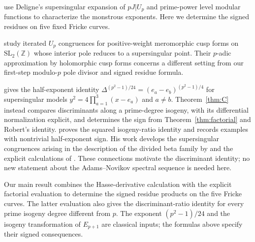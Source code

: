 \documentclass[11pt,a4paper]{article}
\numberwithin{equation}{section}
\theoremstyle{definition}
\theoremstyle{remark}
\newcommand{\Z}{\mathbb Z}
\begin{document}
\citet[Proposition~3.1 and \S4]{DS26} use Deligne's supersingular
expansion of $pJ|U_p$ and prime-power level modular functions to
characterize the monstrous exponents. Here we determine the signed
residues on five fixed Fricke curves.

\citet[Theorem~1.1]{BGKMR26} study iterated $U_p$ congruences for
positive-weight meromorphic cusp forms on $\mathrm{SL}_2(\Z)$ whose
interior pole reduces to a supersingular point. Their $p$-adic
approximation by holomorphic cusp forms concerns a different setting
from our first-step modulo-$p$ pole divisor and signed residue formula.

\citet[Theorem~3, p.~72; \S4]{Landweber88} gives the
half-exponent identity
$\Delta^{(p^2-1)/24}=(e_a-e_b)^{(p^2-1)/4}$ for supersingular
models $y^2=4\prod_{a=1}^3(x-e_a)$ and $a\ne b$.
Theorem~\ref{thm:C} instead compares discriminants along a prime-degree
isogeny, with its differential normalization explicit, and determines
the sign from Theorem~\ref{thm:factorial} and Robert's identity.
\citet[Theorem~1.2 and Remark~4]{Ono25}
proves the squared isogeny-ratio identity and records examples with nontrivial
half-exponent sign. His work develops the supersingular congruences arising in
the description of the divided beta family by \citet[Theorem~1.2]{Behrens09}
and the explicit calculations of \citet[\S5.4, Conjecture~5.17]{Larson20}.
These connections motivate the discriminant identity; no new statement about the
Adams--Novikov spectral sequence is needed here.

Our main result combines the Hasse-derivative calculation with the explicit
factorial evaluation to determine the signed residue products on the five
Fricke curves. The latter evaluation also gives the discriminant-ratio
identity for every prime isogeny degree different from $p$.
The exponent $(p^2-1)/24$ and the isogeny transformation of $E_{p+1}$
are classical inputs; the formulas above specify their signed consequences.
\end{document}
